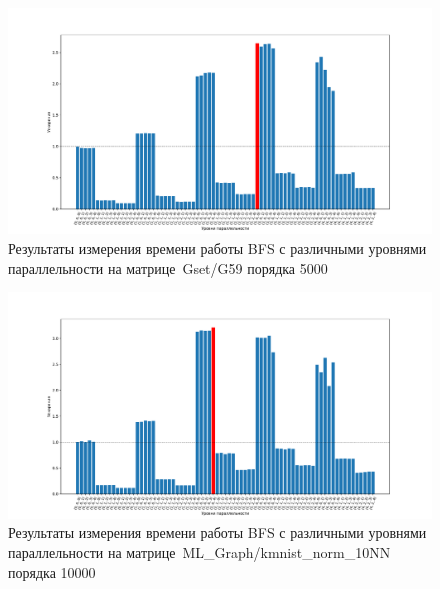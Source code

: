 \begin{landscape}
\begin{figure}
    \thispagestyle{empty} 
    \centering
    \includegraphics[height=0.8\textwidth]{figures/barPlot5000.pdf}
    \caption{Результаты измерения времени работы BFS с различными уровнями параллельности на мат\-ри\-це~Gset/G59 порядка 5000\\}
    \label{fig:barPlot5000}
\end{figure}
\end{landscape}

\begin{landscape}
\begin{figure}
    \thispagestyle{empty} 
    \centering
    \includegraphics[height=0.8\textwidth]{figures/barPlot10000.pdf}
    \caption{Результаты измерения времени работы BFS с различными уровнями параллельности на мат\-ри\-це~ML\_Graph/kmnist\_norm\_10NN порядка 10000\\}
    \label{fig:barPlot10000}
\end{figure}
\end{landscape}


